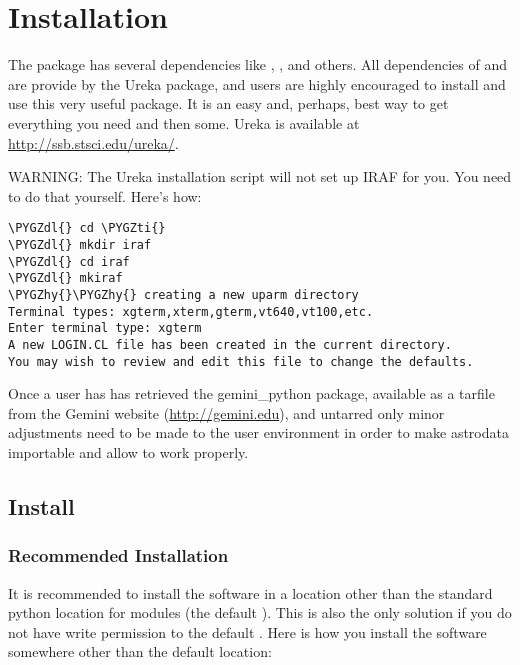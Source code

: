 \documentclass[letterpaper,10pt,english]{sphinxmanual}
\def\PYGZdl{\char`\$}
\def\PYGZhy{\char`\-}
\def\PYGZti{\char`\~}
\begin{document}
\chapter{Installation}
\label{userenv:installation}\label{userenv::doc}
The  package has several dependencies like , ,
and others. All dependencies of  and  are provide by
the Ureka package, and users are highly encouraged to install and use this very
useful package. It is an easy and, perhaps, best way to get everything you need
and then some. Ureka is available at \href{http://ssb.stsci.edu/ureka/}{http://ssb.stsci.edu/ureka/}.

WARNING:  The Ureka installation script will not set up IRAF for you. You need to do
that yourself. Here's how:

\begin{Verbatim}[commandchars=\\\{\}]
\PYGZdl{} cd \PYGZti{}
\PYGZdl{} mkdir iraf
\PYGZdl{} cd iraf
\PYGZdl{} mkiraf
\PYGZhy{}\PYGZhy{} creating a new uparm directory
Terminal types: xgterm,xterm,gterm,vt640,vt100,etc.
Enter terminal type: xgterm
A new LOGIN.CL file has been created in the current directory.
You may wish to review and edit this file to change the defaults.
\end{Verbatim}

Once a user has has retrieved the gemini\_python package, available as a tarfile
from the Gemini website (\href{http://gemini.edu}{http://gemini.edu}), and untarred only minor adjustments
need to be made to the user environment in order to make astrodata importable and
allow  to work properly.


\section{Install}
\label{userenv:config}\label{userenv:install}

\subsection{Recommended Installation}
\label{userenv:recommended-installation}
It is recommended to install the software in a location other than the standard
python location for modules (the default ). This is also the
only solution if you do not have write permission to the default .
Here is how you install the software somewhere other than the default location:
\end{document}
